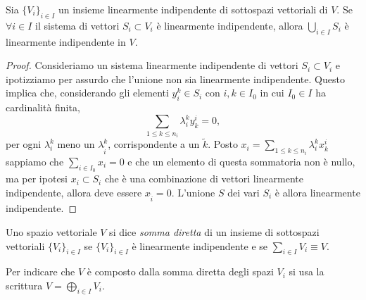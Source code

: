 \begin{teorema} \label{t:unione-sottospazi-linearmente-indipendente}
	Sia $\{V_i\}_{i\in I}$ un insieme linearmente indipendente di sottospazi vettoriali di $V$.
	Se $\forall i\in I$ il sistema di vettori $S_i\subset V_i$ è linearmente indipendente, allora $\bigcup_{i\in I}S_i$ è linearmente indipendente in $V$.
\end{teorema}
\begin{proof}
	Consideriamo un sistema linearmente indipendente di vettori $S_i\subset V_i$ e ipotizziamo per assurdo che l'unione non sia linearmente indipendente.
	Questo implica che, considerando gli elementi $y^k_i\in S_i$ con $i,k\in I_0$ in cui $I_0\in I$ ha cardinalità finita, 
	\begin{equation*}
		\sum_{1\leq k \leq n_i} \lambda^k_i y_k^i = 0,
	\end{equation*}
	per ogni $\lambda^k_i$ meno un $\lambda^k_{\tilde{i}}$, corrispondente a un $\tilde{k}$.
	Posto $  x_i = \sum\limits_{1\leq k \leq n_i} \lambda^k_i x_k^i$ sappiamo che $\sum_{i\in I_0}  x_i = 0$ e che un elemento di questa sommatoria non è nullo, ma per ipotesi $  x_i\subset S_i$ che è una combinazione di vettori linearmente indipendente, allora deve essere $  x_{\tilde{i}} = 0$.
	L'unione $S$ dei vari $S_i$ è allora linearmente indipendente. 
\end{proof}

\begin{definizione} \label{d:somma-diretta}
	Uno spazio vettoriale $V$ si dice \emph{somma diretta} di un insieme di sottospazi vettoriali $\{V_i\}_{i\in I}$ se $\{V_i\}_{i\in I}$ è linearmente indipendente e se $\sum_{i\in I}V_i\equiv V$.
\end{definizione}
Per indicare che $V$ è composto dalla somma diretta degli spazi $V_i$ si usa la scrittura $V=\bigoplus\limits_{i\in I}V_i$.
